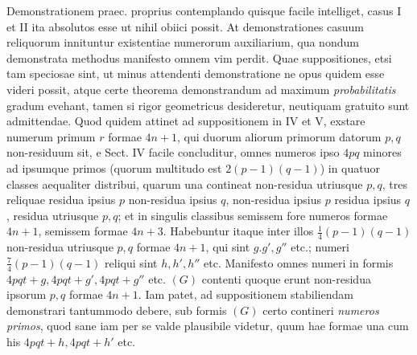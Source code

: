 Demonstrationem praec. proprius contemplando quisque facile intelliget, casus I et II ita absolutos esse ut nihil obiici possit. At demonstrationes casuum reliquorum innituntur existentiae numerorum auxiliarium, qua nondum demonstrata methodus manifesto omnem vim perdit. Quae suppositiones, etsi tam speciosae sint, ut minus attendenti demonstratione ne opus quidem esse videri possit, atque certe theorema demonstrandum ad maximum \emph{probabilitatis} gradum evehant, tamen si rigor geometricus desideretur, neutiquam gratuito sunt admittendae. Quod quidem attinet ad suppositionem in IV et V, exstare numerum primum \(r\) formae \(4n+1\), qui duorum aliorum primorum datorum \(p,q\) non-residuum sit, e Sect. IV facile concluditur, omnes numeros ipso \(4pq\) minores ad ipsumque primos (quorum multitudo est \(2(p-1)(q-1)\)) in quatuor classes aequaliter distribui, quarum una contineat non-residua utriusque \(p,q\), tres reliquae residua ipsius \(p\) non-residua ipsius \(q\), non-residua ipsius \(p\) residua ipsius \(q\), residua utriusque \(p,q\); et in singulis classibus semissem fore numeros formae \(4n+1\), semissem formae \(4n+3\). Habebuntur itaque inter illos \(\frac14(p-1)(q-1)\) non-residua utriusque \(p,q\) formae \(4n+1\), qui sint \(g.g',g''\) etc.; numeri \(\frac74(p-1)(q-1)\) reliqui sint \(h,h',h''\) etc. Manifesto omnes numeri in formis \(4pqt+g,4pqt+g',4pqt+g''\) etc. \((G)\) contenti quoque erunt non-residua ipsorum \(p,q\) formae \(4n+1\). Iam patet, ad suppositionem stabiliendam demonstrari tantummodo debere, sub formis \((G)\) certo contineri \emph{numeros primos}, quod sane iam per se valde plausibile videtur, quum hae formae una cum his \(4pqt+h,4pqt+h'\) etc.
